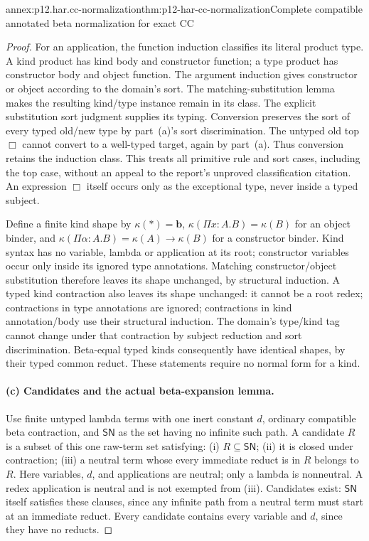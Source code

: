\begin{annexitem}{annex:p12.har.cc-normalization}{thm:p12-har-cc-normalization}{Complete compatible annotated beta normalization for exact CC}
\begin{proof}
For an application, the function induction classifies its literal
product type. A kind product has kind body and constructor function;
a type product has constructor body and object function. The argument
induction gives constructor or object according to the domain's sort.
The matching-substitution lemma makes the resulting kind/type instance
remain in its class. The explicit substitution sort judgment supplies
its typing. Conversion preserves the sort of every typed old/new type
by part~(a)'s sort discrimination. The untyped old top \(\Box\) cannot
convert to a well-typed target, again by part~(a). Thus conversion retains
the induction class. This treats all primitive rule and sort cases,
including the top case, without an appeal to the report's unproved
classification citation. An expression \(\Box\) itself occurs only
as the exceptional type, never inside a typed subject.

Define a finite kind shape by
\(\kappa(\ast)=\mathbf b\),
\(\kappa(\Pi x:A.B)=\kappa(B)\) for an object binder, and
\(\kappa(\Pi\alpha:A.B)=\kappa(A)\to\kappa(B)\) for a constructor
binder. Kind syntax has no variable, lambda or application at its root;
constructor variables occur only inside its ignored type annotations.
Matching constructor/object substitution therefore leaves its shape
unchanged, by structural induction. A typed kind contraction also leaves
its shape unchanged: it cannot be a root redex; contractions in type
annotations are ignored; contractions in kind annotation/body use their
structural induction. The domain's type/kind tag cannot change under
that contraction by subject reduction and sort discrimination.
Beta-equal typed kinds consequently have identical shapes, by their
typed common reduct. These statements require no normal form for a kind.

\paragraph{(c) Candidates and the actual beta-expansion lemma.}
Use finite untyped lambda terms with one inert constant \(d\), ordinary
compatible beta contraction, and \(\mathsf{SN}\) as the set having no
infinite such path. A candidate \(R\) is a subset of this one raw-term
set satisfying: (i) \(R\subseteq\mathsf{SN}\); (ii) it is closed
under contraction; (iii) a neutral term whose every immediate reduct is
in \(R\) belongs to \(R\). Here variables, \(d\), and applications
are neutral; only a lambda is nonneutral. A redex application is neutral
and is not exempted from (iii). Candidates exist: \(\mathsf{SN}\)
itself satisfies these clauses, since any infinite path from a neutral
term must start at an immediate reduct. Every candidate contains every
variable and \(d\), since they have no reducts.


\end{proof}
\end{annexitem}
